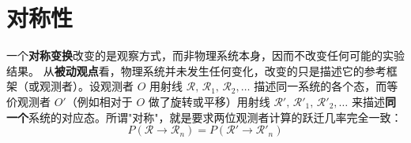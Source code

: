 \section{对称性}
一个\textbf{对称变换}改变的是观察方式，而非物理系统本身，因而不改变任何可能的实验结果。
从\textbf{被动观点}看，物理系统并未发生任何变化，改变的只是描述它的参考框架（或观测者）。设观测者 $O$ 用射线 $\mathscr{R},\,\mathscr{R}_1,\,\mathscr{R}_2,\dots$ 描述同一系统的各个态，而等价观测者 $O'$（例如相对于 $O$ 做了旋转或平移）用射线 $\mathscr{R}',\,\mathscr{R}'_1,\,\mathscr{R}'_2,\dots$ 来描述\textbf{同一个}系统的对应态。所谓"对称"，就是要求两位观测者计算的跃迁几率完全一致：
\begin{equation}
    P(\mathscr{R} \to \mathscr{R}_n) = P(\mathscr{R}' \to \mathscr{R}'_n)
\end{equation}

